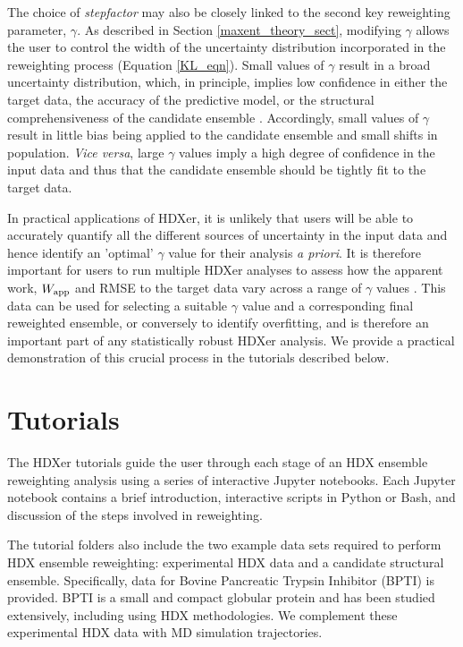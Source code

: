 \documentclass[9pt,tutorial,ASAPversion]{livecoms}
\begin{document}
The choice of \textit{stepfactor} may also be closely linked to the second key reweighting parameter, $\gamma$.
As described in Section \ref{maxent_theory_sect}, modifying $\gamma$ allows the user to control the width of the uncertainty distribution incorporated in the reweighting process (Equation \ref{KL_eqn}).
Small values of $\gamma$ result in a broad uncertainty distribution, which, in principle, implies low confidence in either the target data, the accuracy of the predictive model, or the structural comprehensiveness of the candidate ensemble \cite{Orioli2020, Hummer2015}.
Accordingly, small values of $\gamma$ result in little bias being applied to the candidate ensemble and small shifts in population.
\textit{Vice versa}, large $\gamma$ values imply a high degree of confidence in the input data and thus that the candidate ensemble should be tightly fit to the target data.

In practical applications of HDXer, it is unlikely that users will be able to accurately quantify all the different sources of uncertainty in the input data and hence identify an 'optimal' $\gamma$ value for their analysis \textit{a priori}.
It is therefore important for users to run multiple HDXer analyses to assess how the apparent work, $W_\textnormal{app}$ and RMSE to the target data vary across a range of $\gamma$ values \cite{Orioli2020}.
This data can be used for selecting a suitable $\gamma$ value and a corresponding final reweighted ensemble, or conversely to identify overfitting, and is therefore an important part of any statistically robust HDXer analysis.
We provide a practical demonstration of this crucial process in the tutorials described below.

\section{Tutorials}\label{tutorial_sect}

The HDXer tutorials guide the user through each stage of an HDX ensemble reweighting analysis using a series of interactive Jupyter notebooks.
Each Jupyter notebook contains a brief introduction, interactive scripts in Python or Bash, and discussion of the steps involved in reweighting.

The tutorial folders also include the two example data sets required to perform HDX ensemble reweighting: experimental HDX data and a candidate structural ensemble.
Specifically, data for Bovine Pancreatic Trypsin Inhibitor (BPTI) is provided.
BPTI is a small and compact globular protein and has been studied extensively, including using HDX methodologies. 
We complement these experimental HDX data with MD simulation trajectories.
\end{document}
